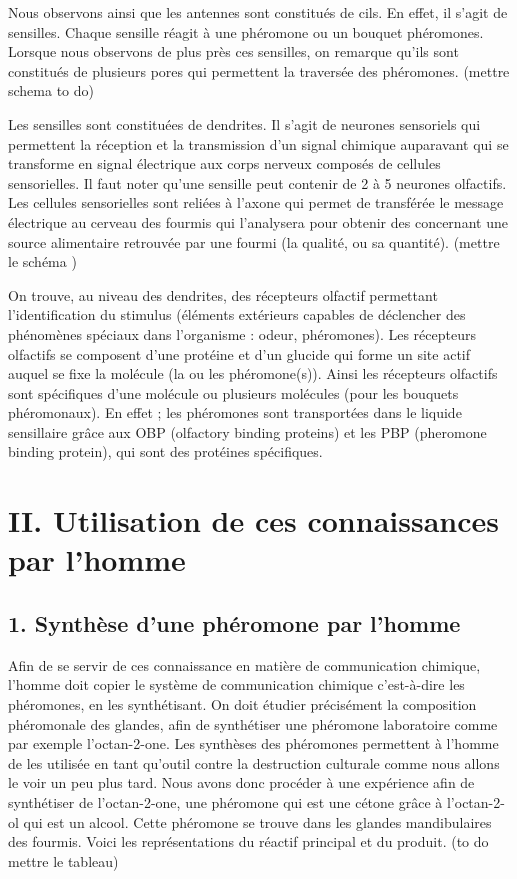 Nous observons ainsi que les antennes sont constitués de cils. En effet,
il s'agit de sensilles. Chaque sensille réagit à une phéromone ou un
bouquet phéromones. Lorsque nous observons de plus près ces sensilles,
on remarque qu'ils sont constitués de plusieurs pores qui permettent la
traversée des phéromones. (mettre schema to do)

Les sensilles sont constituées de dendrites. Il s'agit de neurones
sensoriels qui permettent la réception et la transmission d'un signal
chimique auparavant qui se transforme en signal électrique aux corps
nerveux composés de cellules sensorielles. Il faut noter qu'une sensille
peut contenir de 2 à 5 neurones olfactifs. Les cellules sensorielles
sont reliées à l'axone qui permet de transférée le message électrique au
cerveau des fourmis qui l'analysera pour obtenir des concernant une
source alimentaire retrouvée par une fourmi (la qualité, ou sa
quantité). (mettre le schéma )

On trouve, au niveau des dendrites, des récepteurs olfactif permettant
l'identification du stimulus (éléments extérieurs capables de déclencher
des phénomènes spéciaux dans l'organisme : odeur, phéromones). Les
récepteurs olfactifs se composent d'une protéine et d'un glucide qui
forme un site actif auquel se fixe la molécule (la ou les phéromone(s)).
Ainsi les récepteurs olfactifs sont spécifiques d'une molécule ou
plusieurs molécules (pour les bouquets phéromonaux). En effet ; les
phéromones sont transportées dans le liquide sensillaire grâce aux OBP
(olfactory binding proteins) et les PBP (pheromone binding protein), qui
sont des protéines spécifiques.

\section{II. Utilisation de ces connaissances par
l'homme}\label{ii.-utilisation-de-ces-connaissances-par-lhomme}

\subsection{1. Synthèse d'une phéromone par
l'homme}\label{synthuxe8se-dune-phuxe9romone-par-lhomme}

Afin de se servir de ces connaissance en matière de communication
chimique, l'homme doit copier le système de communication chimique
c'est-à-dire les phéromones, en les synthétisant. On doit étudier
précisément la composition phéromonale des glandes, afin de synthétiser
une phéromone laboratoire comme par exemple l'octan-2-one. Les synthèses
des phéromones permettent à l'homme de les utilisée en tant qu'outil
contre la destruction culturale comme nous allons le voir un peu plus
tard. Nous avons donc procéder à une expérience afin de synthétiser de
l'octan-2-one, une phéromone qui est une cétone grâce à l'octan-2-ol qui
est un alcool. Cette phéromone se trouve dans les glandes mandibulaires
des fourmis. Voici les représentations du réactif principal et du
produit. (to do mettre le tableau)


